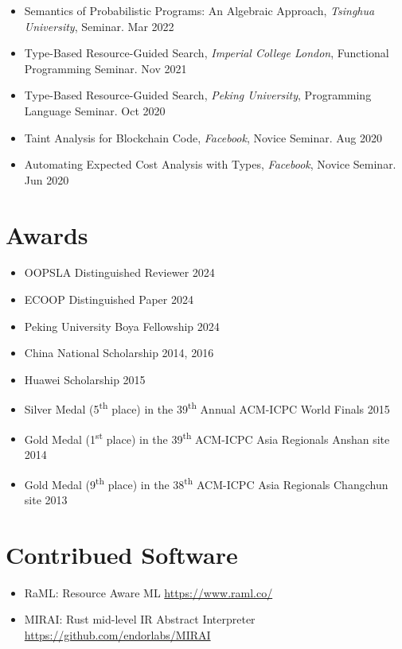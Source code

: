 \documentclass[11pt,letterpaper,sans]{moderncv}        %
\begin{document}
\begin{itemize}
  \item {Semantics of Probabilistic Programs: An Algebraic Approach}, \emph{Tsinghua University}, Seminar. \hfill Mar 2022
  \item {Type-Based Resource-Guided Search}, \emph{Imperial College London}, Functional Programming Seminar. \hfill Nov 2021
  \item {Type-Based Resource-Guided Search}, \emph{Peking University}, Programming Language Seminar. \hfill Oct 2020
  \item {Taint Analysis for Blockchain Code}, \emph{Facebook}, Novice Seminar. \hfill Aug 2020
  \item {Automating Expected Cost Analysis with Types}, \emph{Facebook}, Novice Seminar. \hfill Jun 2020
\end{itemize}

\section{Awards}

\begin{itemize}
\item OOPSLA Distinguished Reviewer \hfill 2024
\item ECOOP Distinguished Paper \hfill 2024
\item Peking University Boya Fellowship \hfill 2024

\vspace{4pt}

\item China National Scholarship \hfill 2014, 2016
\item Huawei Scholarship \hfill 2015

  \vspace{4pt}

  \item Silver Medal (5\textsuperscript{th} place) in the 39\textsuperscript{th} Annual ACM-ICPC World Finals \hfill 2015
  \item Gold Medal (1\textsuperscript{st} place) in the 39\textsuperscript{th} ACM-ICPC Asia Regionals Anshan site \hfill 2014
  \item Gold Medal (9\textsuperscript{th} place) in the 38\textsuperscript{th} ACM-ICPC Asia Regionals Changchun site \hfill 2013
\end{itemize}

\section{Contribued Software}
\begin{itemize}
\item RaML: Resource Aware ML \hfill \url{https://www.raml.co/}
\item MIRAI: Rust mid-level IR Abstract Interpreter \hfill \url{https://github.com/endorlabs/MIRAI}
\end{itemize}
\end{document}
